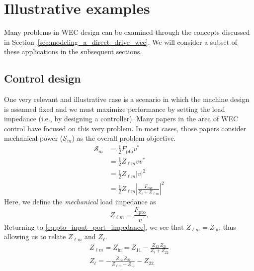 \documentclass[lettersize,journal]{IEEEtran}
\begin{document}
\section{Illustrative examples}\label{sec:illustrative_examples}
Many problems in WEC design can be examined through the concepts discussed in Section~\ref{sec:modeling_a_direct_drive_wec}.
We will consider a subset of these applications in the subsequent sections.%

\subsection{Control design}\label{sec:control_design}
One very relevant and illustrative case is a scenario in which the machine design is assumed fixed and we must maximize performance by setting the load impedance (i.e., by designing a controller).
Many papers in the area of WEC control have focused on this very problem.
In most cases, those papers consider mechanical power ($\mathcal{S}_{m}$) as the overall problem objective.
%
\begin{equation}
\begin{aligned}
        \mathcal{S}_{m} 
        &= \frac{1}{2} F_{\textrm{pto}} v^* \\
        &= \frac{1}{2}Z_{\ell m} v v^* \\
        &= \frac{1}{2}Z_{\ell m} | v |^2 \\
        &= \frac{1}{2} Z_{\ell m} \left| \frac{F_{\textrm{exc}}}{Z_i + Z_{\ell m}} \right|^2
\end{aligned}
\end{equation}
%
Here, we define the \emph{mechanical} load impedance as
%
\begin{equation}
        Z_{\ell m} = \frac{F_{\textrm{pto}}}{v} .
\end{equation}
%
Returning to \eqref{eq:pto_input_port_impedance}, we see that $Z_{\ell m}=Z_{\textrm{in}}$, thus allowing us to relate $Z_{\ell m}$ and $Z_{\ell}$.
%
\begin{subequations}
        \begin{gather}
                Z_{\ell m} = Z_{\textrm{in}} = Z_{11} - \frac{Z_{12} \, Z_{21}}{Z_\ell + Z_{22}} \\
                Z_\ell = - \frac{Z_{12} \,Z_{21} }{Z_{\ell m} - Z_{11}} - Z_{22}
        \end{gather}
        \label{eq:Zl_Zlm}
\end{subequations}
\end{document}
